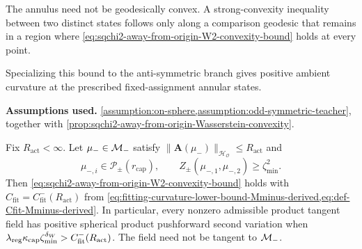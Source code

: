 \begin{remark}
The annulus need not be geodesically convex.  A strong-convexity inequality
between two distinct states follows only along a comparison geodesic that
remains in a region where
\cref{eq:sqchi2-away-from-origin-W2-convexity-bound} holds at every point.
\end{remark}

Specializing this bound to the anti-symmetric branch gives positive ambient
curvature at the prescribed fixed-assignment annular states.

\begin{corollary}
\label{cor:branchwise-positivity-Wasserstein-Mminus}
\textbf{Assumptions used.}
\cref{assumption:on-sphere,assumption:odd-symmetric-teacher}, together with
\cref{prop:sqchi2-away-from-origin-Wasserstein-convexity}.

Fix \(R_{\mathrm{act}}<\infty\).  Let \(\mu_-\in\mathcal{M}_{-}\)
satisfy \(\|\mathbf A(\mu_-)\|_{\mathcal H_{\mathcal O}}\le R_{\mathrm{act}}\) and
\[
    \mu_{-,i}\in\mathcal P_\pm(r_{\mathrm{cap}}),
    \qquad
    Z_\pm(\mu_{-,1},\mu_{-,2})
    \ge
    \zeta_{\min}^2.
\]
Then \cref{eq:sqchi2-away-from-origin-W2-convexity-bound} holds with
\(C_{\mathrm{fit}}=C_{\mathrm{fit}}^{-}(R_{\mathrm{act}})\) from
\cref{eq:fitting-curvature-lower-bound-Mminus-derived,eq:def-Cfit-Mminus-derived}.
In particular, every nonzero
admissible product tangent field has positive spherical product pushforward
second variation when
\(\lambda_{\mathrm{reg}}\kappa_{\mathrm{cap}}\zeta_{\min}^{\delta_W}>
C_{\mathrm{fit}}^{-}(R_{\mathrm{act}})\).  The field need not be tangent
to \(\mathcal{M}_{-}\).
\end{corollary}
